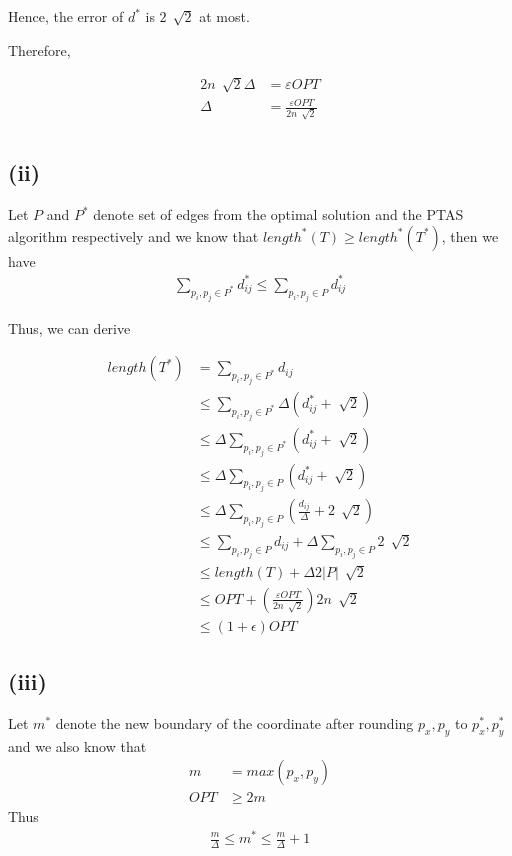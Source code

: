 
Hence, the error of $d^*$  is $2\,\sqrt[]{2}$ at most.

Therefore,

\begin{align*}
    2n\,\sqrt[]{2}\Delta &= \varepsilon OPT\\
    \Delta &= \frac{\varepsilon OPT}{2n\,\sqrt[]{2}}\\
\end{align*}

\subsection*{(ii)}

Let $P$ and $P^*$ denote set of edges from the optimal solution and the PTAS algorithm respectively and we know that $length^*(T) \geq length^*(T^*)$, then we have
\begin{align*}
	\sum_{p_{i},p_{j} \in P^*}{d^*_{ij}} \leq \sum_{p_{i},p_{j} \in P}{d^*_{ij}}
\end{align*}

Thus, we can derive

\begin{align*}
	length(T^*) &= \sum_{p_{i},p_{j} \in P^*}{d_{ij}} \\
	&\leq \sum_{p_{i},p_{j} \in  P^*}{\Delta(d^*_{ij}+\sqrt[]{2})}  \\
	&\leq \Delta \sum_{p_{i},p_{j} \in  P^*}{(d^*_{ij}+\sqrt[]{2})} \\
    &\leq \Delta \sum_{p_{i},p_{j} \in  P}{(d^*_{ij}+\sqrt[]{2})} \\
    &\leq \Delta \sum_{p_{i},p_{j} \in  P}{(\frac{d_{ij}}{\Delta}+2\,\sqrt[]{2})} \\
    &\leq \sum_{p_{i},p_{j} \in  P}{d_{ij}} + \Delta\sum_{p_{i},p_{j} \in  P}{2\,\sqrt[]{2}} \\
    &\leq length\left(T\right) + \Delta2|P|\,\sqrt[]{2} \\
    &\leq OPT + \left( \frac{\varepsilon OPT}{2n\,\sqrt[]{2}} \right) 2n\,\sqrt[]{2} \\
    &\leq (1 + \epsilon )OPT
\end{align*}


\subsection*{(iii)}

Let $m^*$ denote the new boundary of the coordinate after rounding $p_{x}, p_{y}$ to $p^*_{x}, p^*_{y}$
and we also know that
\begin{align*}
			m &= max(p_x,p_y ) \\
			OPT &\geq 2m
\end{align*}
Thus
\begin{align*}
			\frac{m}{\Delta} \leq m^* \leq \frac{m}{\Delta} + 1
\end{align*}

